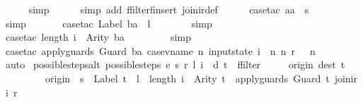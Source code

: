 \begin{isabellebody}
\ \ \ \ \isamarkupfalse%
\ simp\isanewline
\ \ \ \ \isamarkupfalse%
\ {\isacharparenleft}simp\ add{\isacharcolon}\ ffilter{\isacharunderscore}finsert\ join{\isacharunderscore}ir{\isacharunderscore}def{\isacharparenright}\isanewline
\ \ \ \ \isamarkupfalse%
\ {\isacharparenleft}case{\isacharunderscore}tac\ {\isachardoublequoteopen}aa\ {\isacharequal}\ s{\isachardoublequoteclose}{\isacharparenright}\isanewline
\ \ \ \ \ \isamarkupfalse%
\ simp\isanewline
\ \ \ \ \ \isamarkupfalse%
\ {\isacharparenleft}case{\isacharunderscore}tac\ {\isachardoublequoteopen}Label\ ba\ {\isacharequal}\ l{\isachardoublequoteclose}{\isacharparenright}\isanewline
\ \ \ \ \ \ \isamarkupfalse%
\ simp\isanewline
\ \ \ \ \ \ \isamarkupfalse%
\ {\isacharparenleft}case{\isacharunderscore}tac\ {\isachardoublequoteopen}length\ i\ {\isacharequal}\ Arity\ ba{\isachardoublequoteclose}{\isacharparenright}\isanewline
\ \ \ \ \ \ \ \isamarkupfalse%
\ simp\isanewline
\ \ \ \ \ \ \ \isamarkupfalse%
\ {\isacharparenleft}case{\isacharunderscore}tac\ {\isachardoublequoteopen}apply{\isacharunderscore}guards\ {\isacharparenleft}Guard\ ba{\isacharparenright}\ {\isacharparenleft}case{\isacharunderscore}vname\ {\isacharparenleft}{\isasymlambda}n{\isachardot}\ input{}state\ i\ {\isachardollar}\ n{\isacharparenright}\ {\isacharparenleft}{\isasymlambda}n{\isachardot}\ r\ {\isachardollar}\ \ n{\isacharparenright}{\isacharparenright}{\isachardoublequoteclose}{\isacharparenright}\isanewline
\ \ \ \ \isamarkupfalse%
\ auto\isanewline
{}\isamarkupfalse%
%
\endisatagproof
{\isafoldproof}%
%
\isadelimproof
\isanewline
%
\endisadelimproof
\isanewline
{}\isamarkupfalse%
\ possible{\isacharunderscore}steps{\isacharunderscore}alt{\isacharcolon}\ {\isachardoublequoteopen}{\isacharparenleft}possible{\isacharunderscore}steps\ e\ s\ r\ l\ i\ {\isacharequal}\ {\isacharbraceleft}{\isacharbar}{\isacharparenleft}d{\isacharcomma}\ t{\isacharparenright}{\isacharbar}{\isacharbraceright}{\isacharparenright}\ {\isacharequal}\ {\isacharparenleft}ffilter\isanewline
\ \ \ \ \ {\isacharparenleft}{\isasymlambda}{\isacharparenleft}{\isacharparenleft}origin{\isacharcomma}\ dest{\isacharparenright}{\isacharcomma}\ t{\isacharparenright}{\isachardot}\isanewline
\ \ \ \ \ \ \ \ \ origin\ {\isacharequal}\ s\ {\isasymand}\ Label\ t\ {\isacharequal}\ l\ {\isasymand}\ length\ i\ {\isacharequal}\ Arity\ t\ {\isasymand}\ apply{\isacharunderscore}guards\ {\isacharparenleft}Guard\ t{\isacharparenright}\ {\isacharparenleft}join{\isacharunderscore}ir\ i\ r{\isacharparenright}{\isacharparenright}\isanewline

\end{isabellebody}
